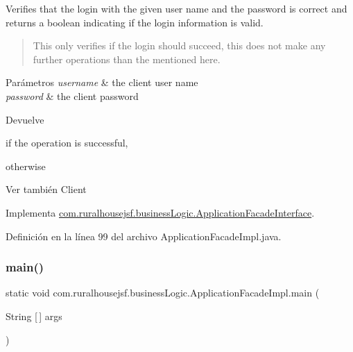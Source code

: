 Verifies that the login with the given user name and the password is correct and returns a boolean indicating if the login information is valid. \begin{quote}
This only verifies if the login should succeed, this does not make any further operations than the mentioned here. \end{quote}



\begin{DoxyParams}{Parámetros}
{\em username} & the client user name \\
\hline
{\em password} & the client password\\
\hline
\end{DoxyParams}
\begin{DoxyReturn}{Devuelve}

\begin{DoxyCode}{0}
\DoxyCodeLine{\textcolor{keyword}{true} }
\end{DoxyCode}
 if the operation is successful,
\begin{DoxyCode}{0}
\DoxyCodeLine{\textcolor{keyword}{false} }
\end{DoxyCode}
 otherwise
\end{DoxyReturn}
\begin{DoxySeeAlso}{Ver también}
Client 
\end{DoxySeeAlso}


Implementa \mbox{\hyperlink{interfacecom_1_1ruralhousejsf_1_1business_logic_1_1_application_facade_interface_a75cc2d20f7df7b8872333cca281bf343}{com.\+ruralhousejsf.\+business\+Logic.\+Application\+Facade\+Interface}}.



Definición en la línea 99 del archivo Application\+Facade\+Impl.\+java.

\mbox{\label{classcom_1_1ruralhousejsf_1_1business_logic_1_1_application_facade_impl_a19d9b0706fe39437efc379c3bc747e06}} 
\subsubsection{\texorpdfstring{main()}{main()}}
{\footnotesize\ttfamily static void com.\+ruralhousejsf.\+business\+Logic.\+Application\+Facade\+Impl.\+main (\begin{DoxyParamCaption}\item[{String \mbox{[}$\,$\mbox{]}}]{args }\end{DoxyParamCaption})\hspace{0.3cm}{\ttfamily [static]}}

